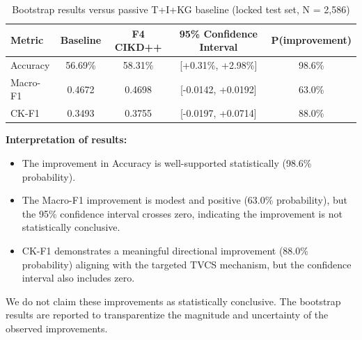 \begin{table}[!t]
\centering
\caption{Bootstrap results versus passive T+I+KG baseline (locked test set, N = 2,586)}
\begin{tabularx}{\textwidth}{|X|c|c|c|c|}
\hline
\textbf{Metric} & \textbf{Baseline} & \textbf{F4 CIKD++} & \textbf{95\% Confidence Interval} & \textbf{P(improvement)} \\
\hline
Accuracy & 56.69\% & 58.31\% & [+0.31\%, +2.98\%] & 98.6\% \\
\hline
Macro-F1 & 0.4672 & 0.4698 & [-0.0142, +0.0192] & 63.0\% \\
\hline
CK-F1 & 0.3493 & 0.3755 & [-0.0197, +0.0714] & 88.0\% \\
\hline
\end{tabularx}
\end{table}

\textbf{Interpretation of results:}
\begin{itemize}
    \item The improvement in Accuracy is well-supported statistically (98.6\% probability).
    \item The Macro-F1 improvement is modest and positive (63.0\% probability), but the 95\% confidence interval crosses zero, indicating the improvement is not statistically conclusive.
    \item CK-F1 demonstrates a meaningful directional improvement (88.0\% probability) aligning with the targeted TVCS mechanism, but the confidence interval also includes zero.
\end{itemize}
We do not claim these improvements as statistically conclusive. The bootstrap results are reported to transparentize the magnitude and uncertainty of the observed improvements.
